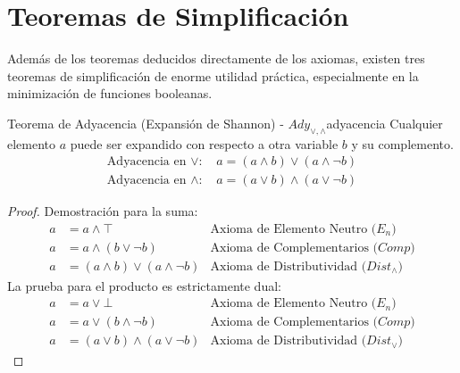 \section{Teoremas de Simplificación}

Además de los teoremas deducidos directamente de los axiomas, existen tres teoremas de simplificación de enorme utilidad práctica, especialmente en la minimización de funciones booleanas.

\begin{teorema}{Teorema de Adyacencia (Expansión de Shannon) - $Ady_{\vee, \wedge}$}{adyacencia}
Cualquier elemento $a$ puede ser expandido con respecto a otra variable $b$ y su complemento.
\begin{align*}
    \text{Adyacencia en $\vee$: } & a = (a \wedge b) \vee (a \wedge \neg b) \\
    \text{Adyacencia en $\wedge$: } & a = (a \vee b) \wedge (a \vee \neg b)
\end{align*}
\tcblower
\begin{proof}
Demostración para la suma:
\begin{align*}
    a &= a \wedge \top & \text{Axioma de Elemento Neutro ($E_n$)} \\
    a &= a \wedge (b \vee \neg b) & \text{Axioma de Complementarios ($Comp$)} \\
    a &= (a \wedge b) \vee (a \wedge \neg b) & \text{Axioma de Distributividad ($Dist_{\wedge}$)}
\end{align*}
La prueba para el producto es estrictamente dual:
\begin{align*}
    a &= a \vee \bot & \text{Axioma de Elemento Neutro ($E_n$)} \\
    a &= a \vee (b \wedge \neg b) & \text{Axioma de Complementarios ($Comp$)} \\
    a &= (a \vee b) \wedge (a \vee \neg b) & \text{Axioma de Distributividad ($Dist_{\vee}$)}
\end{align*}
\end{proof}
\end{teorema}

